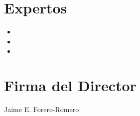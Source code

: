 \documentclass[12pt]{article}
\begin{document}
\section{Expertos}

\begin{itemize}
	\item 
	\item 
	\item  
\end{itemize}


%


\section*{Firma del Director}
\vspace{2.5cm}

Jaime E. Forero-Romero
\end{document}
